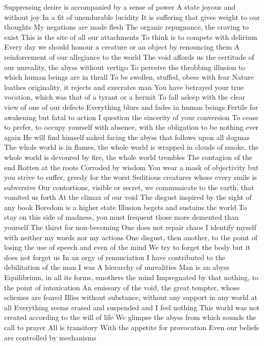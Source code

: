 \documentclass{article}
\begin{document}
Suppressing desire is accompanied by a sense of power
A state joyous and without joy
In a fit of unendurable lucidity
It is suffering that gives weight to our thoughts
My negations are made flesh
The organic repugnance, the craving to exist
This is the site of all our attachments
To think is to compete with delirium
Every day we should honour a creature or an object by renouncing them
A reinforcement of our allegiance to the world
The void affords us the certitude of our unreality, the abyss without vertigo
To perceive the throbbing illusion to which human beings are in thrall
To be swollen, stuffed, obese with fear
Nature loathes originality, it rejects and execrates man
You have betrayed your true vocation, which was that of a tyrant or a hermit
To fall asleep with the clear view of one of our defects
Everything blurs and fades in human beings
Fertile for awakening but fatal to action
I question the sincerity of your conversion
To cease to prefer, to occupy yourself with absence, with the obligation to be nothing ever again
He will find himself naked facing the abyss that follows upon all dogmas
The whole world is in flames, the whole world is wrapped in clouds of smoke, the whole world is devoured by fire, the whole world trembles
The contagion of the end
Rotten at the roots
Corroded by wisdom
You wear a mask of objectivity but you strive to suffer, greedy for the worst
Seditious creatures whose every smile is subversive
Our contortions, visible or secret, we communicate to the earth, that vomited us forth
At the climax of our void
The disgust inspired by the sight of any book
Boredom is a higher state
Illusion begets and sustains the world
To stay on this side of madness, you must frequent those more demented than yourself
The thirst for non-becoming
One does not repair chaos
I identify myself with neither my words nor my actions
One disgust, then another, to the point of losing the use of speech and even of the mind
We try to forget the body but it does not forget us
In an orgy of renunciation
I have contributed to the debilitation of the man I was
A hierarchy of unrealities
Man is an abyss
Equilibrium, in all its forms, smothers the mind
Impregnated by that nothing, to the point of intoxication
An emissary of the void, the great tempter, whose schemes are feared
Bliss without substance, without any support in any world at all
Everything seems erased and suspended and I feel nothing
This world was not created according to the will of life
We glimpse the abyss from which sounds the call to prayer
All is transitory
With the appetite for provocation
Even our beliefs are controlled by mechanisms
\end{document}
